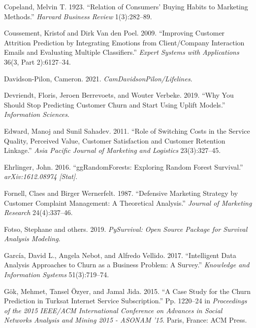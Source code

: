\documentclass[
  12pt,
]{article}
\newlength{\cslhangindent}
\newlength{\cslentryspacingunit} %
\newenvironment{CSLReferences}[2] %
 {%
  \setlength{\parindent}{0pt}
  \ifodd #1
  \let\oldpar\par
  \def\par{\hangindent=\cslhangindent\oldpar}
  \fi
  \setlength{\parskip}{#2\cslentryspacingunit}
 }%
 {}
\begin{document}
\begin{CSLReferences}{1}{0}
\leavevmode{}%
Copeland, Melvin T. 1923. {``Relation of Consumers' Buying Habits to Marketing Methods.''} \emph{Harvard Business Review} 1(3):282--89.

\leavevmode{}%
Coussement, Kristof and Dirk Van den Poel. 2009. {``Improving Customer Attrition Prediction by Integrating Emotions from Client/Company Interaction Emails and Evaluating Multiple Classifiers.''} \emph{Expert Systems with Applications} 36(3, Part 2):6127--34.

\leavevmode{}%
Davidson-Pilon, Cameron. 2021. \emph{CamDavidsonPilon/Lifelines}.

\leavevmode{}%
Devriendt, Floris, Jeroen Berrevoets, and Wouter Verbeke. 2019. {``Why You Should Stop Predicting Customer Churn and Start Using Uplift Models.''} \emph{Information Sciences}.

\leavevmode{}%
Edward, Manoj and Sunil Sahadev. 2011. {``Role of Switching Costs in the Service Quality, Perceived Value, Customer Satisfaction and Customer Retention Linkage.''} \emph{Asia Pacific Journal of Marketing and Logistics} 23(3):327--45.

\leavevmode{}%
Ehrlinger, John. 2016. {``ggRandomForests: Exploring Random Forest Survival.''} \emph{arXiv:1612.08974 {[}Stat{]}}.

\leavevmode{}%
Fornell, Claes and Birger Wernerfelt. 1987. {``Defensive Marketing Strategy by Customer Complaint Management: A Theoretical Analysis.''} \emph{Journal of Marketing Research} 24(4):337--46.

\leavevmode{}%
Fotso, Stephane and others. 2019. \emph{PySurvival: Open Source Package for Survival Analysis Modeling}.

\leavevmode{}%
García, David L., Angela Nebot, and Alfredo Vellido. 2017. {``Intelligent Data Analysis Approaches to Churn as a Business Problem: A Survey.''} \emph{Knowledge and Information Systems} 51(3):719--74.

\leavevmode{}%
Gök, Mehmet, Tansel Özyer, and Jamal Jida. 2015. {``A {Case} {Study} for the {Churn} {Prediction} in {Turksat} {Internet} {Service} {Subscription}.''} Pp. 1220--24 in \emph{Proceedings of the 2015 {IEEE}/{ACM} {International} {Conference} on {Advances} in {Social} {Networks} {Analysis} and {Mining} 2015 - {ASONAM} '15}. Paris, France: ACM Press.


\end{CSLReferences}
\end{document}
